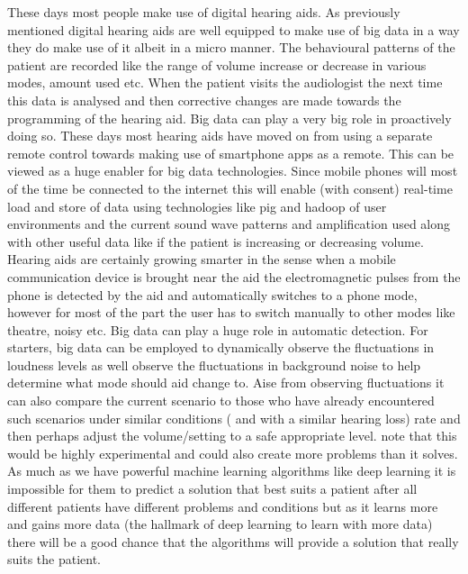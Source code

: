 \documentclass[sigconf]{acmart}
\begin{document}
\newline
 These days most people make use of digital hearing aids. As previously mentioned digital hearing aids are well equipped to make use of big data in a way they do make use of it albeit in a micro manner. The behavioural patterns of the patient are recorded like the range of volume increase or decrease in various modes, amount used etc. When the patient visits the audiologist the next time this data is analysed and then corrective changes are made towards the programming of the hearing aid. Big data can play a very big role in proactively doing so. These days most hearing aids have moved on from using a separate remote control towards making use of smartphone apps as a remote. This can be viewed as a huge enabler for big data technologies. Since mobile phones will most of the time be connected to the internet this will enable (with consent) real-time load and store of data using technologies like pig and hadoop of user environments and the current sound wave patterns and amplification used along with other useful data like if the patient is increasing or decreasing volume. Hearing aids are certainly growing smarter in the sense when a mobile communication device is brought near the aid the electromagnetic pulses from the phone is detected by the aid and automatically switches to a phone mode, however for most of the part the user has to switch manually to other modes like theatre, noisy etc. Big data can play a huge role in automatic detection. For starters, big data can be employed to dynamically observe the fluctuations in loudness levels as well observe the fluctuations in background noise to help determine what mode should aid change to. Aise from observing fluctuations it can also compare the current scenario to those who have already encountered such scenarios under similar conditions ( and with a similar hearing loss) rate and then perhaps adjust the volume/setting to a safe appropriate level. note that this would be highly experimental and could also create more problems than it solves. As much as we have powerful machine learning algorithms like deep learning it is impossible for them to predict a solution that best suits a patient after all different patients have different problems and conditions but as it learns more and gains more data (the hallmark of deep learning to learn with more data) there will be a good chance that the algorithms will  provide a solution that really suits the patient.
 \newline
\end{document}
